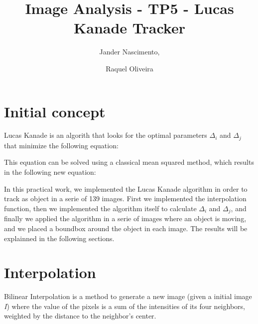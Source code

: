 \documentclass{article}
\begin{document}
\title{Image Analysis - TP5 - Lucas Kanade Tracker}

\author{Jander Nascimento, 
\and Raquel Oliveira}

\maketitle

\section{Initial concept}

	Lucas Kanade is an algorith that looks for the optimal parameters $\Delta_i$ and $\Delta_j$ that minimize the following equation:

	\begin{figure}[H]
		  \centering
	\end{figure}

	This equation can be solved using a classical mean squared method, which results in the following new equation:

	\begin{figure}[H]
		  \centering
	\end{figure}	

	In this practical work, we implemented the Lucas Kanade algorithm in order to track as object in a serie of 139 images. First we implemented the interpolation function, then we implemented the algorithm itself to calculate $\Delta_i$ and $\Delta_j$, and finally we applied the algorithm in a serie of images where an object is moving, and we placed a boundbox around the object in each image. The results will be explainned in the following sections.


\section{Interpolation}

	Bilinear Interpolation is a method to generate a new image (given a initial image {\it I}) where the value of the pixels is a sum of the intensities of its four neighbors, weighted by the distance to the neighbor's center.
\end{document}
